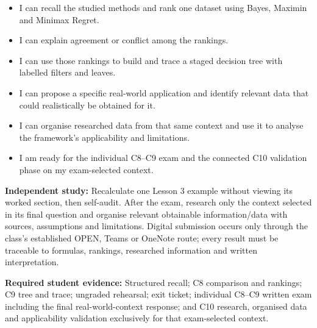 \documentclass[10pt,letterpaper]{article}
\newcommand{\labelled}[2]{\textbf{#1:} #2\par}
\newcommand{\plansection}[1]{\Needspace{8\baselineskip}\par\vspace{8pt}{\large\bfseries #1\par}\vspace{3pt}}
\newcommand{\partheading}[1]{\Needspace{7\baselineskip}\par\vspace{4pt}{\bfseries #1\par}}
\newcommand{\evidenceitem}[1]{\item[$\square$] #1}
\begin{document}
\partheading{Exit Ticket N3}
\begin{itemize}[leftmargin=1.8em,itemsep=1pt]
\evidenceitem{I can recall the studied methods and rank one dataset using Bayes, Maximin and Minimax Regret.}
\evidenceitem{I can explain agreement or conflict among the rankings.}
\evidenceitem{I can use those rankings to build and trace a staged decision tree with labelled filters and leaves.}
\evidenceitem{I can propose a specific real-world application and identify relevant data that could realistically be obtained for it.}
\evidenceitem{I can organise researched data from that same context and use it to analyse the framework's applicability and limitations.}
\evidenceitem{I am ready for the individual C8--C9 exam and the connected C10 validation phase on my exam-selected context.}
\end{itemize}

\labelled{Independent study}{Recalculate one Lesson 3 example without viewing its worked section, then self-audit. After the exam, research only the context selected in its final question and organise relevant obtainable information/data with sources, assumptions and limitations. Digital submission occurs only through the class's established OPEN, Teams or OneNote route; every result must be traceable to formulas, rankings, researched information and written interpretation.}
\labelled{Required student evidence}{Structured recall; C8 comparison and rankings; C9 tree and trace; ungraded rehearsal; exit ticket; individual C8--C9 written exam including the final real-world-context response; and C10 research, organised data and applicability validation exclusively for that exam-selected context.}

\plansection{6. Learning-Evidence Overview and Institutional Completion}
\end{document}
